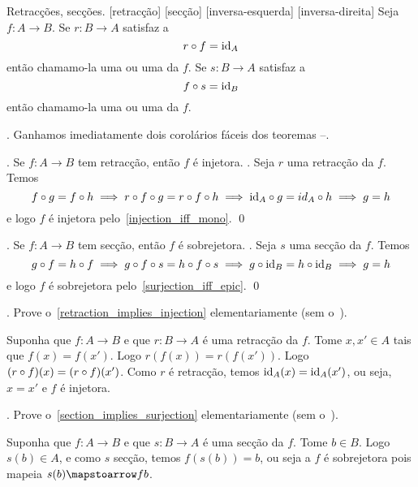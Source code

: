  Retracções, secções.
\label{retractions_sections}%
\label{retraction}%
[retracção]%
[secção]%
[inversa-esquerda]%
[inversa-direita]%
Seja $f : A \to B$.
Se $r : B \to A$ satisfaz a
$$
r \of f = \id_A
$$
então chamamo-la uma  ou uma
 da $f$.
Se $s : B \to A$ satisfaz a
$$
f \of s = \id_B
$$
então chamamo-la uma  ou uma
 da $f$.

\blah.
Ganhamos imediatamente dois corolários fáceis dos teoremas
--.

\corollary.
\label{retraction_implies_injection}%
Se $f : A \to B$ tem retracção, então $f$ é injetora.
\proof.
Seja $r$ uma retracção da $f$.
Temos
$$
f \of g = f \of h
\implies r \of f \of g = r \of f \of h
\implies \id_A \of g = id_A \of h
\implies g = h
$$
e logo $f$ é injetora pelo~\ref{injection_iff_mono}.
\qed

\corollary.
\label{section_implies_surjection}%
Se $f : A \to B$ tem secção, então $f$ é sobrejetora.
\proof.
Seja $s$ uma secção da $f$.
Temos
$$
g \of f = h \of f
\implies g \of f \of s = h \of f \of s
\implies g \of \id_B = h \of \id_B
\implies g = h
$$
e logo $f$ é sobrejetora pelo~\ref{surjection_iff_epic}.
\qed

\exercise.
\label{retraction_implies_injection_elementary_proof}%
Prove o~\ref{retraction_implies_injection} elementariamente (sem o~).

\solution
Suponha que $f : A \to B$ e que $r : B \to A$ é uma retracção da $f$.
Tome $x, x' \in A$ tais que $f(x) = f(x')$.
Logo $r(f(x)) = r(f(x'))$.
Logo $(r\of f)(x) = (r\of f)(x')$.
Como $r$ é retracção, temos $\hbox{\rm id}_A(x) = \hbox{\rm id}_A(x')$, ou seja, $x = x'$ e $f$ é injetora.

\endexercise

\exercise.
\label{section_implies_surjection_elementary_proof}%
Prove o~\ref{section_implies_surjection} elementariamente (sem o~).

\solution
Suponha que $f : A \to B$ e que $s : B \to A$ é uma secção da $f$.
Tome $b \in B$.
Logo $s(b) \in A$, e como $s$ secção, temos $f(s(b)) = b$, ou seja
a $f$ é sobrejetora pois mapeia $s(b) \mapstoarrow f b$.

